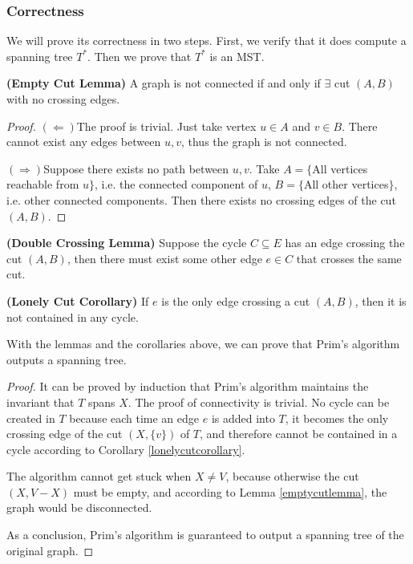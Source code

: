 \subsubsection{Correctness}
We will prove its correctness in two steps. First, we verify that it does compute a spanning tree $T^*$. Then we prove that $T^*$ is an MST. 
\begin{lemma}\textbf{(Empty Cut Lemma)}\label{emptycutlemma}
A graph is not connected if and only if $\exists$ cut $(A,B)$ with no crossing edges.
\end{lemma}
\begin{proof}
$(\Leftarrow)$The proof is trivial. Just take vertex $u\in A$ and $v\in B$. There cannot exist any edges between $u,v$, thus the graph is not connected.

$(\Rightarrow)$Suppose there exists no path between $u,v$. Take $A=\{$All vertices reachable from $u\}$, i.e. the connected component of $u$, $B=\{$All other vertices$\}$, i.e. other connected components. Then there exists no crossing edges of the cut $(A,B)$.
\end{proof}
\begin{lemma}\label{doublecrossinglemma}
\textbf{(Double Crossing Lemma)}
Suppose the cycle $C\subseteq E$ has an edge crossing the cut $(A,B)$, then there must exist some other edge $e\in C$ that crosses the same cut.
\end{lemma}
\begin{corollary}
\textbf{(Lonely Cut Corollary)}\label{lonelycutcorollary}
If $e$ is the only edge crossing a cut $(A,B)$, then it is not contained in any cycle.
\end{corollary}
With the lemmas and the corollaries above, we can prove that Prim's algorithm outputs a spanning tree.
\begin{proof}
It can be proved by induction that Prim's algorithm maintains the invariant that $T$ spans $X$. The proof of connectivity is trivial. No cycle can be created in $T$ because each time an edge $e$ is added into $T$, it becomes the only crossing edge of the cut $(X,\{v\})$ of $T$, and therefore cannot be contained in a cycle according to Corollary \ref{lonelycutcorollary}. 

The algorithm cannot get stuck when $X\neq V$, because otherwise the cut $(X,V-X)$ must be empty, and according to Lemma \ref{emptycutlemma}, the graph would be disconnected. 

As a conclusion, Prim's algorithm is guaranteed to output a spanning tree of the original graph.
\end{proof}
